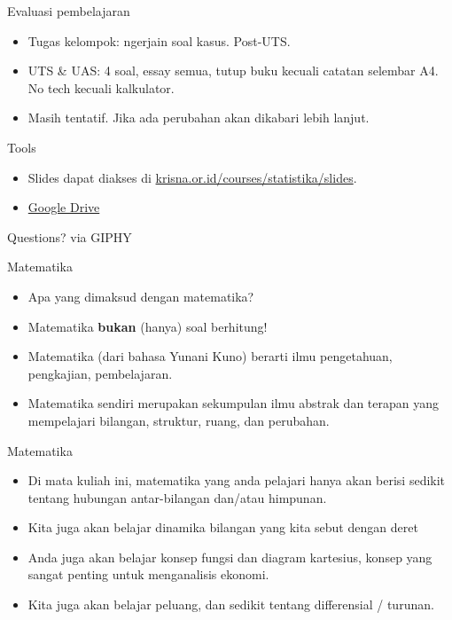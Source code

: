 \documentclass[
  ignorenonframetext,
]{beamer}
\begin{document}
\begin{frame}{Evaluasi pembelajaran}
\label{evaluasi-pembelajaran-1}
\begin{itemize}
\item
  Tugas kelompok: ngerjain soal kasus. Post-UTS.
\item
  UTS \& UAS: 4 soal, essay semua, tutup buku kecuali catatan selembar
  A4. No tech kecuali kalkulator.
\item
  Masih tentatif. Jika ada perubahan akan dikabari lebih lanjut.
\end{itemize}
\end{frame}

\begin{frame}{Tools}
\label{tools}
\begin{itemize}
\item
  Slides dapat diakses di
  \href{https://www.krisna.or.id/courses/statistika/slides}{krisna.or.id/courses/statistika/slides}.
\item
  \href{https://drive.google.com/drive/folders/1s8YHrlTFrp-Iu0ip6FesyKahNHLo5had?usp=sharing}{Google
  Drive}
\end{itemize}
\end{frame}

\begin{frame}{Questions?}
\label{questions}
via GIPHY
\end{frame}

\begin{frame}{Matematika}
\label{matematika}
\begin{itemize}[<+->]
\item
  Apa yang dimaksud dengan matematika?
\item
  Matematika \textbf{bukan} (hanya) soal berhitung!
\item
  Matematika (dari bahasa Yunani Kuno) berarti ilmu pengetahuan,
  pengkajian, pembelajaran.
\item
  Matematika sendiri merupakan sekumpulan ilmu abstrak dan terapan yang
  mempelajari bilangan, struktur, ruang, dan perubahan.
\end{itemize}
\end{frame}

\begin{frame}{Matematika}
\label{matematika-1}
\begin{itemize}
\item
  Di mata kuliah ini, matematika yang anda pelajari hanya akan berisi
  sedikit tentang hubungan antar-bilangan dan/atau himpunan.
\item
  Kita juga akan belajar dinamika bilangan yang kita sebut dengan deret
\item
  Anda juga akan belajar konsep fungsi dan diagram kartesius, konsep
  yang sangat penting untuk menganalisis ekonomi.
\item
  Kita juga akan belajar peluang, dan sedikit tentang differensial /
  turunan.
\end{itemize}
\end{frame}
\end{document}

